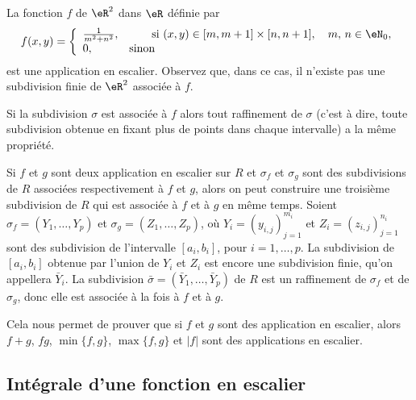 \begin{example}
  La fonction $f$ de $\eR^2$ dans $\eR$ définie par 
  \begin{equation}
    f(x,y)=\left\{
    \begin{array}{ll}
      \frac{1}{m^2+n^2},&\qquad \textrm{si } (x,y) \in [m,m+1]\times[n,n+1], \quad m,\,n\in\eN_0,\\
0, &\textrm{sinon} 
    \end{array}\right.
  \end{equation}
est une application en escalier. Observez que, dans ce cas, il n'existe pas une subdivision finie de $\eR^2$ associée à $f$. 
\end{example}
\begin{remark}
 Si la subdivision $\sigma$ est associée à $f$ alors tout raffinement de $\sigma$ (c'est à dire, toute subdivision obtenue en fixant plus de points dans chaque intervalle) a la même propriété. 

Si $f$ et $g$ sont deux application en escalier sur $R$ et $\sigma_f$ et $\sigma_g$ sont des subdivisions de $R$ associées respectivement à $f$ et $g$, alors on peut construire une troisième subdivision de $R$ qui est associée à $f$ et à $g$ en même temps. Soient $\sigma_f=(Y_{1},\ldots, Y_{p})$ et $\sigma_g=(Z_{1},\ldots, Z_{p})$, où $Y_{i}=(y_{i,j})_{j=1}^{m_i}$ et $Z_{i}=(z_{i,j})_{j=1}^{n_i}$ sont des subdivision de l'intervalle $[a_i, b_i]$, pour $i=1,\ldots, p$. La subdivision de $[a_i, b_i]$ obtenue par l'union de $Y_i$ et $Z_i$ est encore une subdivision finie, qu'on appellera $\bar Y_i$. La subdivision $\bar \sigma = (\bar Y_{1},\ldots,\bar Y_{p})$ de $R$ est un raffinement de $\sigma_f $ et de $\sigma_g$, donc elle est associée à la fois à $f$ et à $g$. 

Cela nous permet de prouver que si $f$ et $g$ sont des application en escalier, alors $f+g$, $fg$, $\min\{f,g\}$, $\max\{f,g\}$ et $|f|$ sont des applications en escalier. 
\end{remark}

\subsection{Intégrale d'une fonction en escalier}

